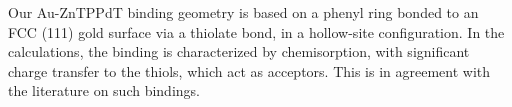 \documentclass[aip,jcp,a4paper,reprint,floatfix,superscriptaddress]{revtex4-1}
\newcommand{\etal}{\emph{et al.}\xspace}
\begin{document}











Our Au-ZnTPPdT binding geometry is based on a phenyl ring bonded to an FCC (111) gold surface via a thiolate bond, in a hollow-site configuration.\cite{Nara2004,Andrews2006,Kondo2006,Pontes2011}
In the calculations, the binding is characterized by chemisorption, with significant charge transfer to the thiols, which act as acceptors. This is in agreement with the literature on such bindings.\cite{Xue2003a,Xue2003b,Love2005,Hoft2006,Romaner2006} %
\end{document}
